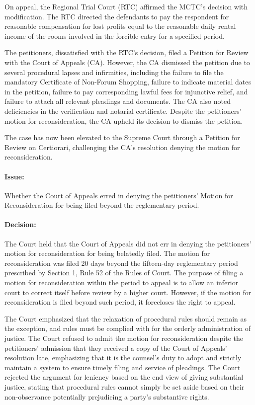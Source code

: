 \documentclass[
12pt,
oneside,
onehalfspacing,
headsepline
]{DigestCollection}
\begin{document}
On appeal, the Regional Trial Court (RTC) affirmed the MCTC's decision with modification. The RTC directed the defendants to pay the respondent for reasonable compensation for lost profits equal to the reasonable daily rental income of the rooms involved in the forcible entry for a specified period.

The petitioners, dissatisfied with the RTC's decision, filed a Petition for Review with the Court of Appeals (CA). However, the CA dismissed the petition due to several procedural lapses and infirmities, including the failure to file the mandatory Certificate of Non-Forum Shopping, failure to indicate material dates in the petition, failure to pay corresponding lawful fees for injunctive relief, and failure to attach all relevant pleadings and documents. The CA also noted deficiencies in the verification and notarial certificate. Despite the petitioners' motion for reconsideration, the CA upheld its decision to dismiss the petition.

The case has now been elevated to the Supreme Court through a Petition for Review on Certiorari, challenging the CA's resolution denying the motion for reconsideration.

\paragraph{Issue:}
\label{59fbc1a0-1236-11ef-aa24-9916ea601717}


Whether the Court of Appeals erred in denying the petitioners' Motion for Reconsideration for being filed beyond the reglementary period.

\paragraph{Decision:}
\label{86019160-122e-11ef-aa24-9916ea601717}


The Court held that the Court of Appeals did not err in denying the petitioners' motion for reconsideration for being belatedly filed. The motion for reconsideration was filed 20 days beyond the fifteen-day reglementary period prescribed by Section 1, Rule 52 of the Rules of Court. The purpose of filing a motion for reconsideration within the period to appeal is to allow an inferior court to correct itself before review by a higher court. However, if the motion for reconsideration is filed beyond such period, it forecloses the right to appeal.

The Court emphasized that the relaxation of procedural rules should remain as the exception, and rules must be complied with for the orderly administration of justice. The Court refused to admit the motion for reconsideration despite the petitioners' admission that they received a copy of the Court of Appeals' resolution late, emphasizing that it is the counsel's duty to adopt and strictly maintain a system to ensure timely filing and service of pleadings. The Court rejected the argument for leniency based on the end view of giving substantial justice, stating that procedural rules cannot simply be set aside based on their non-observance potentially prejudicing a party's substantive rights.
\end{document}
